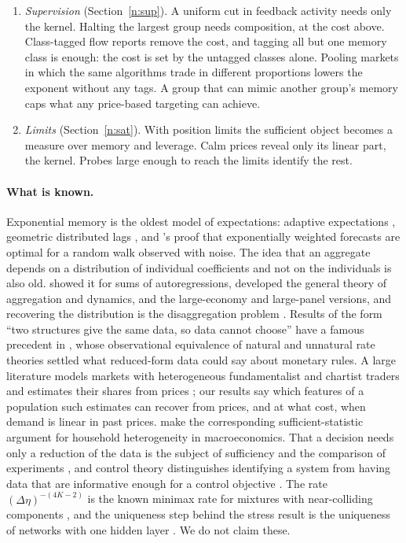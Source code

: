 \documentclass[12pt]{article}
\theoremstyle{definition}
\theoremstyle{remark}
\begin{document}
\begin{enumerate}[label=(\arabic*),leftmargin=*,itemsep=2pt]
\item \emph{Supervision} (Section~\ref{n:sup}). A uniform cut in feedback activity needs only the kernel. Halting the largest group needs composition, at the cost above. Class-tagged flow reports remove the cost, and tagging all but one memory class is enough: the cost is set by the untagged classes alone. Pooling markets in which the same algorithms trade in different proportions lowers the exponent without any tags. A group that can mimic another group's memory caps what any price-based targeting can achieve.
\item \emph{Limits} (Section~\ref{n:sat}). With position limits the sufficient object becomes a measure over memory and leverage. Calm prices reveal only its linear part, the kernel. Probes large enough to reach the limits identify the rest.
\end{enumerate}

\paragraph{What is known.} Exponential memory is the oldest model of expectations: adaptive expectations \citep{cagan1956,nerlove1958}, geometric distributed lags \citep{koyck1954}, and \citet{muth1960}'s proof that exponentially weighted forecasts are optimal for a random walk observed with noise. The idea that an aggregate depends on a distribution of individual coefficients and not on the individuals is also old. \citet{granger1980} showed it for sums of autoregressions, \citet{forni1997} developed the general theory of aggregation and dynamics, \citet{zaffaroni2004} and \citet{pesaran2014} the large-economy and large-panel versions, and recovering the distribution is the disaggregation problem \citep{celov2008}. Results of the form ``two structures give the same data, so data cannot choose'' have a famous precedent in \citet{sargent1976}, whose observational equivalence of natural and unnatural rate theories settled what reduced-form data could say about monetary rules. A large literature models markets with heterogeneous fundamentalist and chartist traders \citep{brock1998,hommes2006} and estimates their shares from prices \citep{boswijk2007,franke2012,lux2018}; our results say which features of a population such estimates can recover from prices, and at what cost, when demand is linear in past prices. \citet{auclert2024} make the corresponding sufficient-statistic argument for household heterogeneity in macroeconomics. That a decision needs only a reduction of the data is the subject of sufficiency and the comparison of experiments \citep{blackwell1953,lecam1964}, and control theory distinguishes identifying a system from having data that are informative enough for a control objective \citep{vanwaarde2020}. The rate $(\Delta\eta)^{-(4K-2)}$ is the known minimax rate for mixtures with near-colliding components \citep{heinrich2018,wu2020}, and the uniqueness step behind the stress result is the uniqueness of networks with one hidden layer \citep{sussmann1992}. We do not claim these.
\end{document}
